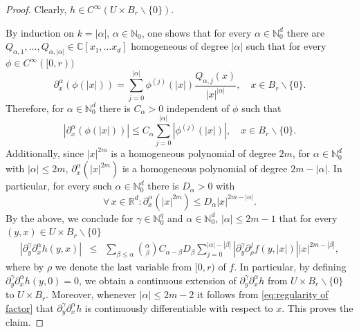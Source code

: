 \documentclass[a4paper,10pt]{amsart}
\newtheorem*{crucial lemma}{Lemma \ref{lem:nice polynomial2}}
\theoremstyle{definition}
\newcommand{\R}{\mathbb{R}}
\newcommand{\C}{\mathbb{C}}
\newcommand{\N}{\mathbb{N}}
\begin{document}
\begin{proof}
	Clearly, $h\in C^{\infty}(U\times B_r\backslash\{0\})$.
	
	By induction on $k=|\alpha|$, $\alpha\in\N_0$, one shows that for every $\alpha\in\N_0^d$ there are $Q_{\alpha,1}, \ldots, Q_{\alpha,|\alpha|}\in \C[x_1,\ldots x_d]$ homogeneous of degree $|\alpha|$ such that for every $\phi\in C^{\infty}([0,r))$
	\[\partial_x^\alpha \left(\phi(|x|)\right)
	=\sum_{j=0}^{|\alpha|}\phi^{(j)}(|x|)\frac{Q_{\alpha,j}(x)}{|x|^{|\alpha|}},\quad x\in B_r\backslash\{0\}.
	\]  
	Therefore, for $\alpha\in\N_0^d$ there is $C_\alpha>0$ independent of $\phi$ such that
	\[\left|\partial_x^\alpha \left(\phi(|x|)\right)\right|
	\leq C_\alpha\sum_{j=0}^{|\alpha|}\left|\phi^{(j)}(|x|)\right|,\quad x\in B_r\backslash\{0\}.
	\]  
	Additionally, since $|x|^{2m}$ is a homogeneous polynomial of degree $2m$, for $\alpha\in\N_0^d$ with $|\alpha|\leq 2m$, $\partial_x^\alpha\left(|x|^{2m}\right)$ is a homogeneous polynomial of degree $2m-|\alpha|$. In particular, for every such $\alpha\in\N_0^d$ there is $D_\alpha>0$ with
	\[\forall\,x\in\R^d\colon \partial_x^\alpha\left(|x|^{2m}\right)\leq D_\alpha|x|^{2m-|\alpha|}.\]
	By the above, we conclude for $\gamma\in\N_0^q$ and $\alpha\in\N_0^d$, $|\alpha|\leq 2m-1$ that for every $(y,x)\in U\times B_r\backslash\{0\}$
	\begin{eqnarray}\label{eq:regularity of factor}
		\left|\partial_y^\gamma\partial_x^\alpha h(y,x)\right|&\leq&\sum_{\beta\leq \alpha}\binom{\alpha}{\beta}C_{\alpha-\beta}D_{\beta}\sum_{j=0}^{|\alpha|-|\beta|}\left|\partial_y^\gamma\partial_\rho^j f(y,|x|)\right| |x|^{2m-|\beta|},
	\end{eqnarray}
	where by $\rho$ we denote the last variable from $[0,r)$ of $f$. In particular, by defining $\partial_y^\gamma\partial_x^\alpha h(y,0)=0$, we obtain a continuous extension of $\partial_y^\gamma\partial_x^\alpha h$ from $U\times B_r\backslash\{0\}$ to $U\times B_r$. Moreover, whenever $|\alpha|\leq 2m-2$ it follows from \eqref{eq:regularity of factor} that $\partial_y^\gamma \partial_x^\alpha h$ is continuously differentiable with respect to $x$. This proves the claim.
\end{proof}
\end{document}
